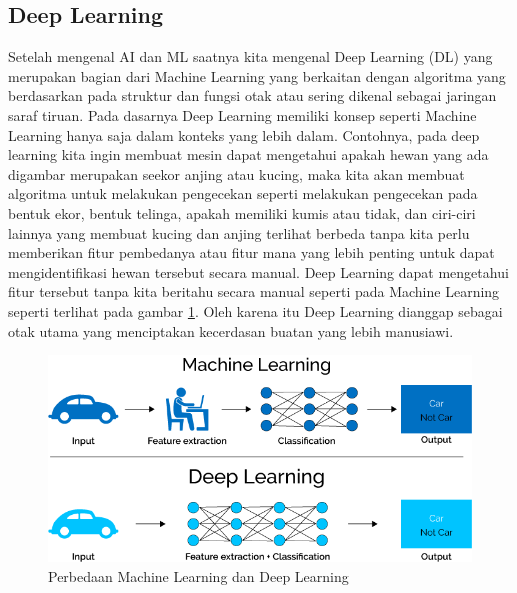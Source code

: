 \subsection{Deep Learning}
Setelah mengenal AI dan ML saatnya kita mengenal Deep Learning (DL) yang merupakan bagian dari Machine Learning yang berkaitan dengan algoritma yang berdasarkan pada struktur dan fungsi otak atau sering dikenal sebagai jaringan saraf tiruan. Pada dasarnya Deep Learning memiliki konsep seperti Machine Learning hanya saja dalam konteks yang lebih dalam. Contohnya, pada deep learning kita ingin membuat mesin dapat mengetahui apakah hewan yang ada digambar merupakan seekor anjing atau kucing, maka kita akan membuat algoritma untuk melakukan pengecekan seperti melakukan pengecekan pada bentuk ekor, bentuk telinga, apakah memiliki kumis atau tidak, dan ciri-ciri lainnya yang membuat kucing dan anjing terlihat berbeda tanpa kita perlu memberikan fitur pembedanya atau fitur mana yang lebih penting untuk dapat mengidentifikasi hewan tersebut secara manual. Deep Learning dapat mengetahui fitur tersebut tanpa kita beritahu secara manual seperti pada Machine Learning seperti terlihat pada gambar \ref{deep learning}. Oleh karena itu Deep Learning dianggap sebagai otak utama yang menciptakan kecerdasan buatan yang lebih manusiawi.
\begin{figure}[!htbp]
        \centerline{\includegraphics[scale=.45]{figures/deeplearning}}
        \caption{Perbedaan Machine Learning dan Deep Learning}
		\label{deep learning}
\end{figure}

